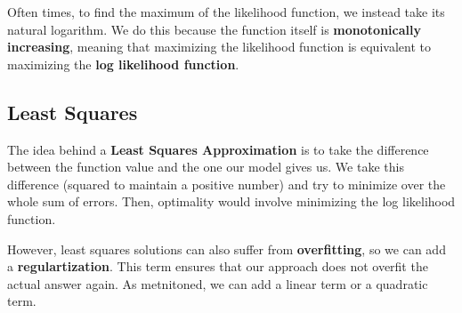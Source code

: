 \documentclass{tufte-handout}
\begin{document}
	Often times, to find the maximum of the likelihood function, we instead take its natural
	logarithm. We do this because the function itself is \textbf{monotonically increasing},
	meaning that maximizing the likelihood function is equivalent to maximizing the 
	\textbf{log likelihood function}.
	\subsection{Least Squares}
	The idea behind a \textbf{Least Squares Approximation} is to take the difference between the 
	function value and the one our model gives us. We take this difference (squared to maintain a
	positive number) and try to minimize over the whole sum of errors. Then, optimality would involve
	minimizing the log likelihood function.

	However, least squares solutions can also suffer from \textbf{overfitting}, so we can add
	a \textbf{regulartization}. This term ensures that our approach does not overfit the actual
	answer again. As metnitoned, we can add a linear term or a quadratic term.
\end{document}
